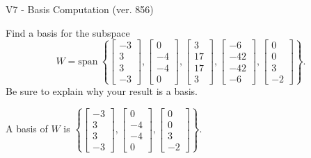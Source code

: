 \begin{exercise}
  \begin{exerciseTitle}V7 - Basis Computation (ver. 856)\end{exerciseTitle}
  \begin{exerciseStatement}
    Find a basis for the subspace 
\[W=\mathrm{span}\ \left\{\left[\begin{array}{r}
-3 \\
3 \\
3 \\
-3
\end{array}\right] , \left[\begin{array}{r}
0 \\
-4 \\
-4 \\
0
\end{array}\right] , \left[\begin{array}{r}
3 \\
17 \\
17 \\
3
\end{array}\right] , \left[\begin{array}{r}
-6 \\
-42 \\
-42 \\
-6
\end{array}\right] , \left[\begin{array}{r}
0 \\
0 \\
3 \\
-2
\end{array}\right]\right\}.\]
 Be sure to explain why your result is a basis.


  \end{exerciseStatement}
  \begin{exerciseAnswer}
   A basis of \(W\) is  \(\left\{\left[\begin{array}{r}
-3 \\
3 \\
3 \\
-3
\end{array}\right] , \left[\begin{array}{r}
0 \\
-4 \\
-4 \\
0
\end{array}\right] , \left[\begin{array}{r}
0 \\
0 \\
3 \\
-2
\end{array}\right]\right\}\).
  


  \end{exerciseAnswer}
\end{exercise}